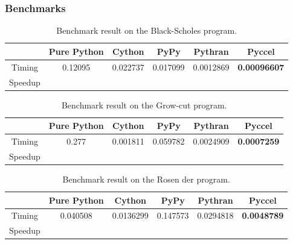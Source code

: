 \begin{frame}
\frametitle{Benchmarks}
%
\footnotesize
\begin{table}[!ht] 
  \centering
  \begin{tabular}{c||c c c c c}
    \hline
            & Pure Python & Cython      & PyPy      & Pythran  & Pyccel
    \\\hline
     Timing &   0.12095        &  0.022737     &   0.017099      &  0.0012869    & \textbf{0.00096607} 
    \\
    Speedup &            &        &         &      &
    \\\hline
  \end{tabular}
  \caption{Benchmark result on the Black-Scholes program.}
\end{table}
%

%
\begin{table}[!ht] 
  \centering
  \begin{tabular}{c||c c c c c}
    \hline
            & Pure Python & Cython      & PyPy      & Pythran  & Pyccel
    \\\hline
     Timing &    0.277       &  0.001811     &   0.059782     & 0.0024909   & \textbf{0.0007259} 
    \\
    Speedup &            &        &         &      &
    \\\hline
  \end{tabular}
  \caption{Benchmark result on the Grow-cut program.}
\end{table}
%
%
\begin{table}[!ht] 
  \centering
  \begin{tabular}{c||c c c c c}
    \hline
            & Pure Python & Cython      & PyPy      & Pythran  & Pyccel
    \\\hline
    Timing  &   0.040508  &  0.0136299  &  0.147573 & 0.0294818 & \textbf{0.0048789} 
    \\
    Speedup &            &        &         &      &
    \\\hline
  \end{tabular}
  \caption{Benchmark result on the Rosen der program.}
\end{table}
%
\end{frame}



























